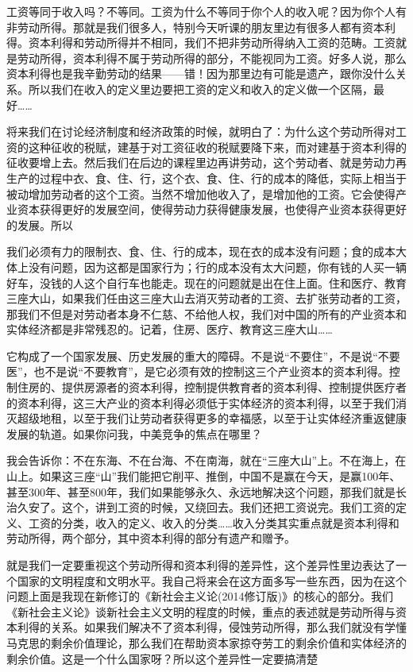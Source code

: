 \documentclass[UTF8, 12pt, a4paper]{ctexrep}
\begin{document}
工资等同于收入吗？不等同。工资为什么不等同于你个人的收入呢？因为你个人有非劳动所得。那就是我们很多人，特别今天听课的朋友里边有很多人都有资本利得。资本利得和劳动所得并不相同，我们不把非劳动所得纳入工资的范畴。工资就是劳动所得，资本利得不属于劳动所得的部分，不能视同为工资。好多人说，那么资本利得也是我辛勤劳动的结果——错！因为那里边有可能是遗产，跟你没什么关系。所以我们在收入的定义里边要把工资的定义和收入的定义做一个区隔，最好……

将来我们在讨论经济制度和经济政策的时候，就明白了：为什么这个劳动所得对工资的这种征收的税赋，建基于对工资征收的税赋要降下来，而对建基于资本利得的征收要增上去。然后我们在后边的课程里边再讲劳动，这个劳动者、就是劳动力再生产的过程中衣、食、住、行，这个衣、食、住、行的成本的降低，实际上相当于被动增加劳动者的这个工资。当然不增加他收入了，是增加他的工资。它会使得产业资本获得更好的发展空间，使得劳动力获得健康发展，也使得产业资本获得更好的发展。所以

我们必须有力的限制衣、食、住、行的成本，现在衣的成本没有问题；食的成本大体上没有问题，因为这都是国家行为；行的成本没有太大问题，你有钱的人买一辆好车，没钱的人这个自行车也能走。现在的问题就是出在住上面。住和医疗、教育三座大山，如果我们任由这三座大山去消灭劳动者的工资、去扩张劳动者的工资，那我们不但是对劳动者本身不仁慈、不给他人权，我们对中国的所有的产业资本和实体经济都是非常残忍的。记着，住房、医疗、教育这三座大山……

它构成了一个国家发展、历史发展的重大的障碍。不是说“不要住”，不是说“不要医”，也不是说“不要教育”，是它必须有效的控制这三个产业资本的资本利得。控制住房的、提供房源者的资本利得，控制提供教育者的资本利得、控制提供医疗者的资本利得，这三大产业的资本利得必须低于实体经济的资本利得，以至于我们消灭超级地租，以至于我们让劳动者获得更多的幸福感，以至于让实体经济重返健康发展的轨道。如果你问我，中美竞争的焦点在哪里？

我会告诉你：不在东海、不在台海、不在南海，就在“三座大山”上。不在海上，在山上。如果这三座“山”我们能把它削平、推倒，中国不是赢在今天，是赢100年、甚至300年、甚至800年，我们如果能够永久、永远地解决这个问题，那我们就是长治久安了。这个，讲到工资的时候，又绕回去。我们还把工资说完。我们工资的定义、工资的分类，收入的定义、收入的分类……收入分类其实重点就是资本利得和劳动所得，两个部分，其中资本利得的部分有遗产和赠予。

就是我们一定要重视这个劳动所得和资本利得的差异性，这个差异性里边表达了一个国家的文明程度和文明水平。我自己将来会在这方面多写一些东西，因为在这个问题上面是我现在新修订的《新社会主义论(2014修订版)》的核心的部分。我们《新社会主义论》谈新社会主义文明的程度的时候，重点的表述就是劳动所得与资本利得的关系。如果我们解决不了资本利得，侵蚀劳动所得，那么我们就没有学懂马克思的剩余价值理论，那么我们在帮助资本家掠夺劳工的剩余价值和实体经济的剩余价值。这是一个什么国家呀？所以这个差异性一定要搞清楚
\end{document}
